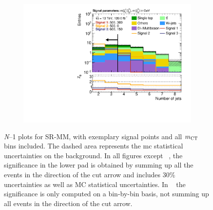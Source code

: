 \begin{figure}
	\begin{subfigure}[b]{0.45\linewidth}
		\centering\includegraphics[width=\textwidth]{n1_SRMM_mct_bins/nJet30.pdf}
		\vspace{-2em}
		\caption{\label{fig:Wh_reopt_second_round_n1_srmm_njet}}
	\end{subfigure}
	\caption{\textit{N}--1 plots for SR-MM, with exemplary signal points and all $m_{\textrm{CT}}$ bins included. The dashed area represents the \gls{mc} statistical uncertainties on the background. In all figures except \figname~, the significance in the lower pad is obtained by summing up all the events in the direction of the cut arrow and includes 30\% uncertainties as well as MC statistical uncertainties. In \figname~ the significance is only computed on a bin-by-bin basis, \ie not summing up all events in the direction of the cut arrow.}
	\label{fig:Wh_reopt_second_round_n1_srmm}
\end{figure}

